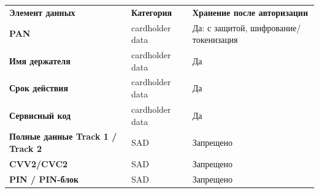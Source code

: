 \begingroup
\renewcommand{\arraystretch}{1.28}
\begin{tabularx}{\textwidth}{
    >{\raggedright\arraybackslash\bfseries}p{}
    >{\raggedright\arraybackslash}p{}
    Y
  }
  \textbf{Элемент данных}         & \textbf{Категория} &
  \textbf{Хранение после авторизации}                     \\
  PAN                             & cardholder data    &
  \textcolor{Good}{Да: с защитой, шифрование/токенизация} \\
  Имя держателя                   & cardholder data    &
  \textcolor{Good}{Да}                                    \\
  Срок действия                   & cardholder data    &
  \textcolor{Good}{Да}                                    \\
  Сервисный код                   & cardholder data    &
  \textcolor{Good}{Да}                                    \\
  Полные данные Track 1 / Track 2 & SAD                &
  \textcolor{Bad}{Запрещено}                              \\
  CVV2/CVC2                       & SAD                &
  \textcolor{Bad}{Запрещено}                              \\
  PIN / PIN-блок                  & SAD                &
  \textcolor{Bad}{Запрещено}                              \\
\end{tabularx}
\endgroup
